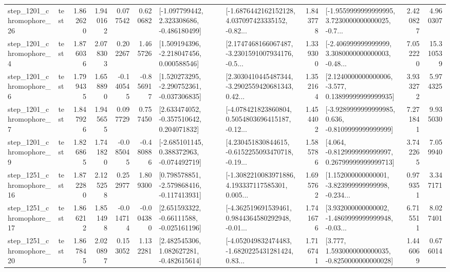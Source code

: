 \begin{tabular}{llrrrrllrlrr}
 step\_1201\_chromophore\_26 &      test &      1.862620 &    1.940162 &      0.077542 &  0.620682 &   [-1.097799442, 2.323308686, -0.486180499] &  [-1.6876442162152128, 4.037097423335152, -0.82... &       1.843778 &  [-1.9559999999999995, 3.7230000000000025, -0.7... &            2.420827 &          4.960307 \\
  step\_1201\_chromophore\_4 &      test &      1.876036 &    2.078303 &      0.202267 &  1.465726 &    [1.509194396, -2.218047456, 0.000588546] &  [2.1747468166067487, -3.2301591007934176, -0.5... &       1.339300 &  [-2.406999999999999, 3.3080000000000003, -0.48... &            7.052220 &         15.310539 \\
  step\_1201\_chromophore\_6 &      test &      1.799435 &    1.658890 &     -0.140545 & -0.856917 &   [1.520273295, -2.290752361, -0.037306835] &  [2.3030410445487344, -3.2902559420681343, 0.42... &       1.352164 &  [2.1240000000000006, -3.577, 0.13899999999999935] &            3.933272 &          5.974325 \\
  step\_1201\_chromophore\_7 &      test &      1.847926 &    1.945655 &      0.097729 &  0.757450 &    [2.633474052, -0.357510642, 0.204071832] &  [-4.078421823860804, 0.5054803696415187, -0.12... &       1.454402 &  [-3.9289999999999985, 0.636, -0.8109999999999999] &            7.271841 &          9.935030 \\
  step\_1201\_chromophore\_9 &      test &      1.826865 &    1.741820 &     -0.085045 & -0.480886 &   [-2.685101145, 0.388372963, -0.074492719] &  [4.230451830844615, -0.6152255093470718, -0.19... &       1.585786 &  [4.064, -0.8129999999999997, 0.26799999999999713] &            3.742265 &          7.059940 \\
 step\_1251\_chromophore\_16 &      test &      1.872280 &    2.125258 &      0.252977 &  1.809300 &   [0.798578851, -2.579868416, -0.117413931] &  [-1.3082210083971886, 4.193337117585301, 0.005... &       1.695762 &  [1.152000000000001, -3.823999999999998, -0.234... &            0.979351 &          3.347171 \\
 step\_1251\_chromophore\_17 &      test &      1.866212 &    1.851498 &     -0.014714 & -0.004380 &    [2.651593322, -0.66111588, -0.025161196] &  [-4.362519691539461, 0.9844364580292948, -0.01... &       1.741676 &  [3.932000000000002, -1.4869999999999948, -0.03... &            6.715511 &          8.027401 \\
 step\_1251\_chromophore\_20 &      test &      1.867845 &    2.020897 &      0.153052 &  1.132281 &    [2.482545306, 1.082627281, -0.482615614] &  [-4.052049832474483, -1.6820225431281424, 0.83... &       1.716741 &   [3.777, 1.5930000000000035, -0.8250000000000028] &            1.446069 &          0.676014 \\

\end{tabular}
